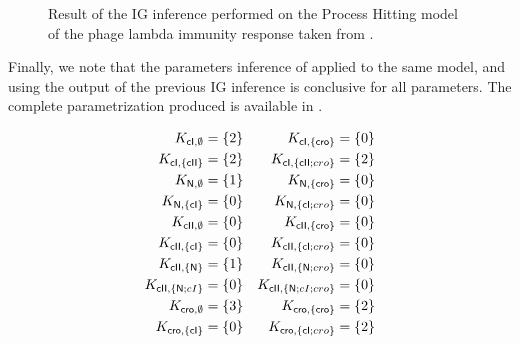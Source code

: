 \begin{figure}[t]
\centering
{}
\caption{\label{fig:phage-lambda-ig}%
  Result of the IG inference performed on the Process Hitting model
  of the phage lambda immunity response
  taken from \cite{thieffry_dynamical_1995}.
}
\end{figure}

Finally, we note that the parameters inference of  applied to the same model,
and using the output of the previous IG inference is conclusive for all parameters.
The complete parametrization produced is available in .

\begin{table}[t]
\begin{align*}
  K_{\mathsf{cI}, \emptyset} &= \{2\} &
  K_{\mathsf{cI}, \{\mathsf{cro}\}} &= \{0\} \\
  K_{\mathsf{cI}, \{\mathsf{cII}\}} &= \{2\} &
  K_{\mathsf{cI}, \{\mathsf{cII};cro\}} &= \{2\} \\
  K_{\mathsf{N}, \emptyset} &= \{1\} &
  K_{\mathsf{N}, \{\mathsf{cro}\}} &= \{0\} \\
  K_{\mathsf{N}, \{\mathsf{cI}\}} &= \{0\} &
  K_{\mathsf{N}, \{\mathsf{cI};cro\}} &= \{0\} \\
  K_{\mathsf{cII}, \emptyset} &= \{0\} &
  K_{\mathsf{cII}, \{\mathsf{cro}\}} &= \{0\} \\
  K_{\mathsf{cII}, \{\mathsf{cI}\}} &= \{0\} &
  K_{\mathsf{cII}, \{\mathsf{cI};cro\}} &= \{0\} \\
  K_{\mathsf{cII}, \{\mathsf{N}\}} &= \{1\} &
  K_{\mathsf{cII}, \{\mathsf{N};cro\}} &= \{0\} \\
  K_{\mathsf{cII}, \{\mathsf{N};cI\}} &= \{0\} &
  K_{\mathsf{cII}, \{\mathsf{N};cI;cro\}} &= \{0\} \\
  K_{\mathsf{cro}, \emptyset} &= \{3\} &
  K_{\mathsf{cro}, \{\mathsf{cro}\}} &= \{2\} \\
  K_{\mathsf{cro}, \{\mathsf{cI}\}} &= \{0\} &
  K_{\mathsf{cro}, \{\mathsf{cI};cro\}} &= \{2\}
\end{align*}
\caption{\label{tb:phage-lambda-k}%
  Result of the parameters inference performed on the Process Hitting model
  of the phage lambda immunity response
  taken from \cite{thieffry_dynamical_1995}.
}
\end{table}

